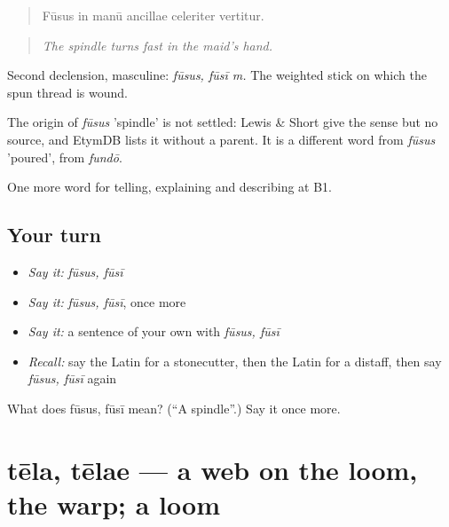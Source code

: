 \begin{quote}
Fūsus in manū ancillae celeriter vertitur.
\end{quote}

\begin{quote}
\emph{The spindle turns fast in the maid's hand.}
\end{quote}

Second declension, masculine: \emph{fūsus, fūsī m.} The weighted stick on which the spun thread is wound.

\begin{cousinweb}
The origin of \emph{fūsus} 'spindle' is not settled: Lewis \& Short give the sense but no source, and EtymDB lists it without a parent. It is a different word from \emph{fūsus} 'poured', from \emph{fundō}.
\end{cousinweb}

\begin{grammarlens}[title={What you've built}]
One more word for telling, explaining and describing at B1.
\end{grammarlens}

\subsection*{Your turn}
\begin{itemize}
\raggedright
  \item \emph{Say it:} \emph{fūsus, fūsī}
  \item \emph{Say it:} \emph{fūsus, fūsī}, once more
  \item \emph{Say it:} a sentence of your own with \emph{fūsus, fūsī}
  \item \emph{Recall:} say the Latin for a stonecutter, then the Latin for a distaff, then say \emph{fūsus, fūsī} again
\end{itemize}

\begin{tcolorbox}[breakable,colback=teal!4,colframe=teal!35!black,title={Before you move on}]
What does fūsus, fūsī mean? (\textquotedblleft{}A spindle\textquotedblright{}.) Say it once more.
\end{tcolorbox}
\section[tēla, tēlae]{tēla, tēlae — a web on the loom, the warp; a loom}

\label{lesson:LA-C472-tela}



